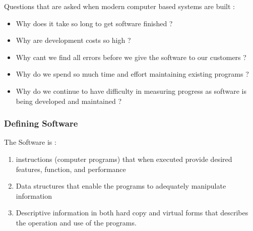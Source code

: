\documentclass{article}
\begin{document}
	Questions that are asked when modern computer based systems are built :
	\begin{itemize}
		\item Why does it take so long to get software finished ?
		\item Why are development costs so high ?
		\item Why cant we find all errors before we give the software to our customers ?
		\item Why do we spend so much time and effort maintaining existing programs ?
		\item Why do we continue to have difficulty in measuring progress as software is being developed and
			maintained ?
	\end{itemize}

	\subsubsection{Defining Software}
	The Software is :
	\begin{enumerate}[label=\roman*.]
		\item instructions (computer programs) that when executed provide desired features, function, and
			performance
		\item Data structures that enable the programs to adequately manipulate information
		\item Descriptive information in both hard copy and virtual forms that describes the operation and use
			of the programs.
	\end{enumerate} \newpage
\end{document}
